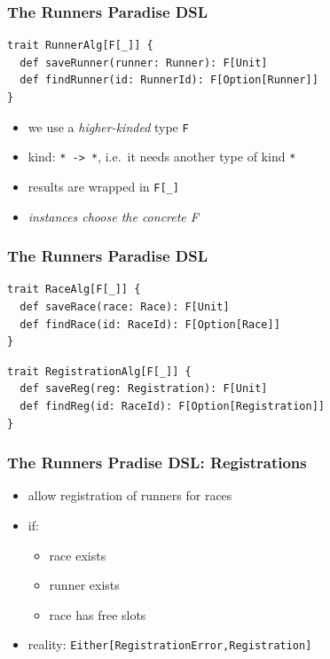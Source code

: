 \documentclass{beamer}
\begin{document}
\begin{frame}[fragile]
  \frametitle{The Runners Paradise DSL}
\begin{verbatim}
trait RunnerAlg[F[_]] {
  def saveRunner(runner: Runner): F[Unit]
  def findRunner(id: RunnerId): F[Option[Runner]]
}
\end{verbatim}
  \begin{itemize}
  \item we use a \textit{higher-kinded} type \texttt{F}
  \item kind: \texttt{* -> *}, i.e.\ it needs another type of kind
    \texttt{*}
  \item results are wrapped in \texttt{F[\_]}
  \item \textit{instances choose the concrete F}
  \end{itemize}
\end{frame}

\begin{frame}[fragile]
  \frametitle{The Runners Paradise DSL}
\begin{verbatim}
trait RaceAlg[F[_]] {
  def saveRace(race: Race): F[Unit]
  def findRace(id: RaceId): F[Option[Race]]
}
\end{verbatim}
\begin{verbatim}
trait RegistrationAlg[F[_]] {
  def saveReg(reg: Registration): F[Unit]
  def findReg(id: RaceId): F[Option[Registration]]
}
\end{verbatim}
\end{frame}

\begin{frame}
  \frametitle{The Runners Pradise DSL: Registrations}
  \begin{itemize}
  \item allow registration of runners for races
  \item if:
    \begin{itemize}
    \item race exists
    \item runner exists
    \item race has free slots
    \end{itemize}
  \item reality: \texttt{Either[RegistrationError,Registration]}
  \end{itemize}
\end{frame}
\end{document}
